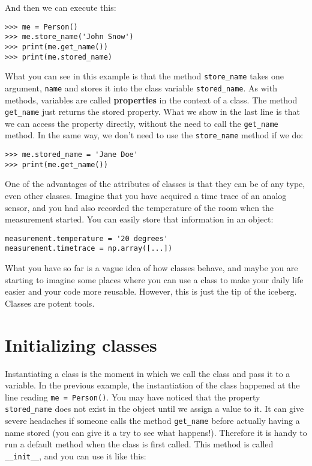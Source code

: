 And then we can execute this:

\begin{verbatim}
>>> me = Person()
>>> me.store_name('John Snow')
>>> print(me.get_name())
>>> print(me.stored_name)
\end{verbatim}

What you can see in this example is that the method \texttt{store_name} takes one argument, \texttt{name} and stores it into the class variable \texttt{stored_name}. As with methods, variables are called \textbf{properties} in the context of a class. The method \texttt{get_name} just returns the stored property. What we show in the last line is that we can access the property directly, without the need to call the \texttt{get_name} method. In the same way, we don't need to use the \texttt{store_name} method if we do:

\begin{verbatim}
>>> me.stored_name = 'Jane Doe'
>>> print(me.get_name())
\end{verbatim}

One of the advantages of the attributes of classes is that they can be of any type, even other classes. Imagine that you have acquired a time trace of an analog sensor, and you had also recorded the temperature of the room when the measurement started. You can easily store that information in an object:

\begin{verbatim}
measurement.temperature = '20 degrees'
measurement.timetrace = np.array([...])
\end{verbatim}

What you have so far is a vague idea of how classes behave, and maybe you are starting to imagine some places where you can use a class to make your daily life easier and your code more reusable. However, this is just the tip of the iceberg. Classes are potent tools.

\section{Initializing classes}\label{sec:initializing-classes}
Instantiating a class is the moment in which we call the class and pass it to a variable. In the previous example, the instantiation of the class happened at the line reading \texttt{me = Person()}. You may have noticed that the property \texttt{stored_name} does not exist in the object until we assign a value to it. It can give severe headaches if someone calls the method \texttt{get_name} before actually having a name stored (you can give it a try to see what happens!). Therefore it is handy to run a default method when the class is first called. This method is called \texttt{__init__}, and you can use it like this:


